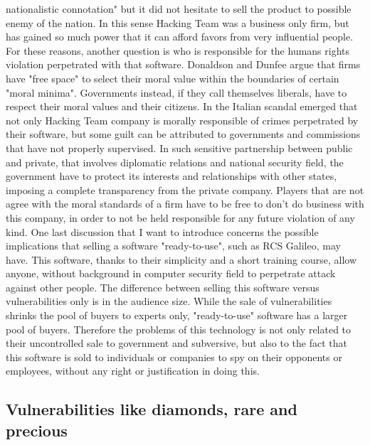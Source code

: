 nationalistic connotation" \cite{ht_CCSIRS} but it did not hesitate to sell the product to possible enemy of the nation. In this sense Hacking Team was a business only firm, but has gained so much power that it can afford favors from very influential people. For these reasons, another question is who is responsible for the humans rights violation perpetrated with that software. Donaldson and Dunfee\cite{business_ethics} argue that firms have "free space" to select their moral value within the boundaries of certain "moral minima". Governments instead, if they call themselves liberals, have to respect their moral values and their citizens. In the Italian scandal emerged that not only Hacking Team company is morally responsible of crimes perpetrated by their software, but some guilt can be attributed to governments and commissions that have not properly supervised. In such sensitive partnership between public and private, that involves diplomatic relations and national security field, the government have to protect its interests and relationships with other states, imposing a complete transparency from the private company. Players that are not agree with the moral standards of a firm have to be free to don't do business with this company, in order to not be held responsible for any future violation of any kind\cite{sep-ethics-business}. One last discussion that I want to introduce concerns the possible implications that selling a software "ready-to-use", such as RCS Galileo, may have. This software, thanks to their simplicity and a short training course, allow anyone, without background in computer security field to perpetrate attack against other people. The difference between selling this software versus vulnerabilities only is in the audience size. While the sale of vulnerabilities shrinks the pool of buyers to experts only, "ready-to-use" software has a larger pool of buyers. Therefore the problems of this technology is not only related to their uncontrolled sale to government and subversive, but also to the fact that this software is sold to individuals or companies to spy on their opponents or employees, without any right or justification in doing this.          

\subsection*{Vulnerabilities like diamonds, rare and precious}
